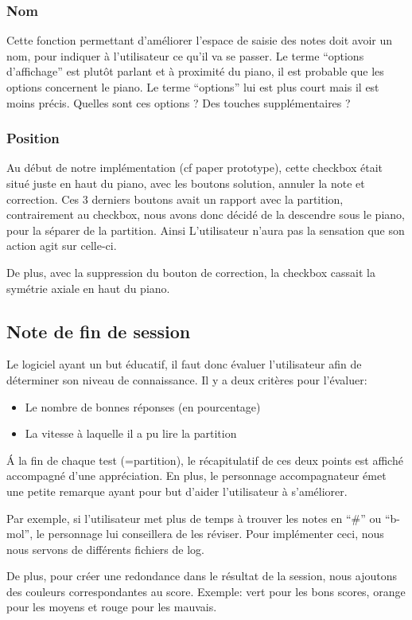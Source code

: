 \documentclass{article}
\begin{document}
\subsubsection{Nom}
Cette fonction permettant d'améliorer l'espace de saisie des notes doit avoir un nom, pour indiquer à l'utilisateur ce qu'il va se 
passer. Le terme ``options d'affichage'' est plutôt parlant et à proximité du piano, il est probable que les options concernent le 
piano.
Le terme ``options'' lui est plus court mais il est moins précis. Quelles sont ces options ? Des touches supplémentaires ?

\subsubsection{Position}
Au début de notre implémentation (cf paper prototype), cette checkbox était situé juste en haut du piano, avec les boutons
solution, annuler la note et correction. Ces 3 derniers boutons avait un rapport avec la partition, contrairement au checkbox,
nous avons donc décidé de la descendre sous le piano, pour la séparer de la partition. Ainsi L'utilisateur n'aura pas la sensation que
son action agit sur celle-ci.


De plus, avec la suppression du bouton de correction, la checkbox cassait la symétrie axiale en haut du piano. 
\subsection{Note de fin de session}
Le logiciel ayant un but éducatif, il faut donc évaluer l'utilisateur afin de déterminer son niveau de connaissance.
Il y a deux critères pour l'évaluer:
\begin{itemize}
 \item Le nombre de bonnes réponses (en pourcentage)
 \item La vitesse à laquelle il a pu lire la partition
\end{itemize}
\'A la fin de chaque test (=partition), le récapitulatif de ces deux points est affiché accompagné d'une appréciation.
En plus, le personnage accompagnateur émet une petite remarque ayant pour but d'aider l'utilisateur à s'améliorer.

Par exemple, si l'utilisateur met plus de temps à trouver les notes en ``\#'' ou ``b-mol'', le personnage lui conseillera de les réviser.
Pour implémenter ceci, nous nous servons de différents fichiers de log.


De plus, pour créer une redondance dans le résultat de la session, nous ajoutons des couleurs correspondantes au score. Exemple: vert pour les bons scores,
orange pour les moyens et rouge pour les mauvais.
\end{document}
